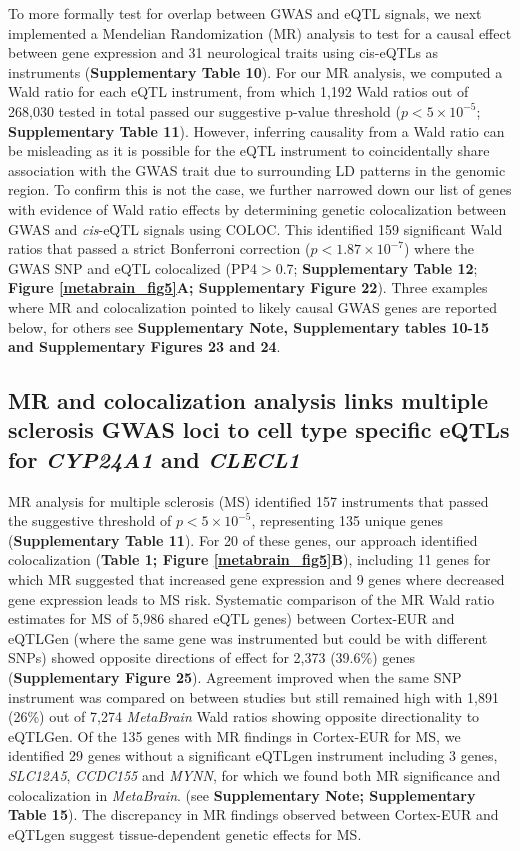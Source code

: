 To more formally test for overlap between GWAS and eQTL signals, we next implemented a Mendelian Randomization (MR) analysis to test for a causal effect between gene expression and 31 neurological traits using cis-eQTLs as instruments (\textbf{Supplementary Table 10}).  For our MR analysis, we computed a Wald ratio for each eQTL instrument, from which 1,192 Wald ratios out of 268,030 tested in total passed our suggestive p-value threshold ($p<5 \times 10^{-5}$; \textbf{Supplementary Table 11}). However, inferring causality from a Wald ratio can be misleading as it is possible for the eQTL instrument to coincidentally share association with the GWAS trait due to surrounding LD patterns in the genomic region.  To confirm this is not the case, we further narrowed down our list of genes with evidence of Wald ratio effects by determining genetic colocalization between GWAS and \emph{cis}-eQTL signals using COLOC\cite{deelenGenotypeHarmonizerAutomatic2014}. This identified 159 significant Wald ratios that passed a strict Bonferroni correction ($p<1.87 \times 10^{-7}$) where the GWAS SNP and eQTL colocalized (PP4$>$0.7; \textbf{Supplementary Table 12}; \textbf{Figure \ref{metabrain_fig5}A; Supplementary Figure 22}). Three examples where MR and colocalization pointed to likely causal GWAS genes are reported below, for others see \textbf{Supplementary Note, Supplementary tables 10-15 and Supplementary Figures 23 and 24}. 



\subsection{MR and colocalization analysis links multiple sclerosis GWAS loci to cell type specific eQTLs for \emph{CYP24A1} and \emph{CLECL1}}
MR analysis for multiple sclerosis (MS) identified 157 instruments that passed the suggestive threshold of $p<5 \times 10^{-5}$, representing 135 unique genes (\textbf{Supplementary Table 11}). For 20 of these genes, our approach identified colocalization (\textbf{Table 1; Figure \ref{metabrain_fig5}B}), including 11 genes for which MR suggested that increased gene expression and 9 genes where decreased gene expression leads to MS risk. Systematic comparison of the MR Wald ratio estimates for MS of 5,986 shared eQTL genes) between Cortex-EUR and eQTLGen (where the same gene was instrumented but could be with different SNPs)\cite{vosaUnravelingPolygenicArchitecture2018} showed opposite directions of effect for 2,373 (39.6\%) genes (\textbf{Supplementary Figure 25}).  Agreement improved when the same SNP instrument was compared on between studies but still remained high with 1,891 (26\%) out of 7,274 \emph{MetaBrain} Wald ratios showing opposite directionality to eQTLGen. Of the 135 genes with MR findings in Cortex-EUR for MS, we identified 29 genes without a significant eQTLgen instrument including 3 genes, \emph{SLC12A5}, \emph{CCDC155} and \emph{MYNN}, for which we found both MR significance and colocalization in \emph{MetaBrain}. (see \textbf{Supplementary Note; Supplementary Table 15}). The discrepancy in MR findings observed between Cortex-EUR and eQTLgen suggest tissue-dependent genetic effects for MS. 

